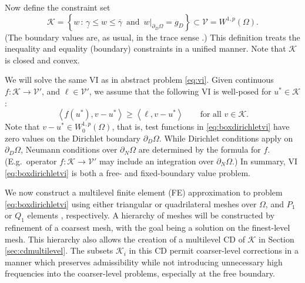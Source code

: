\documentclass[letterpaper,final,12pt,reqno]{amsart}
\theoremstyle{cstyle}
\theoremstyle{cstyle*}
\theoremstyle{dstyle}
\numberwithin{equation}{section}
\numberwithin{figure}{section}
\numberwithin{table}{section}
\numberwithin{theorem}{section}
\newcommand{\cK}{\mathcal{K}}
\newcommand{\cV}{\mathcal{V}}
\newcommand{\ip}[2]{\left<#1,#2\right>}
\begin{document}
Now define the constraint set
\begin{equation}
\cK = \left\{w\,:\,\underline{\gamma} \le w \le \overline{\gamma} \, \text{ and }\, w\big|_{\partial_D \Omega} = g_D\right\} \subset \cV =W^{1,p}(\Omega).
\end{equation}
(The boundary values are, as usual, in the trace sense \cite{Evans2010}.)  This definition treats the inequality and equality (boundary) constraints in a unified manner.  Note that $\cK$ is closed and convex.

We will solve the same VI as in abstract problem \eqref{eq:vi}.  Given continuous $f:\cK \to \cV'$, and $\ell \in \cV'$, we assume that the following VI is well-posed for $u^*\in \cK$:
\begin{equation}
\ip{f(u^*)}{v-u^*} \ge \ip{\ell}{v-u^*} \qquad \text{for all } v\in \cK. \label{eq:boxdirichletvi}
\end{equation}
Note that $v-u^* \in W_0^{1,p}(\Omega)$, that is, test functions in \eqref{eq:boxdirichletvi} have zero values on the Dirichlet boundary $\partial_D\Omega$.  While Dirichlet conditions apply on $\partial_D\Omega$, Neumann conditions over $\partial_N \Omega$ are determined by the formula for $f$.  (E.g.~operator $f:\cK\to\cV'$ may include an integration over $\partial_N\Omega$.)  In summary, VI \eqref{eq:boxdirichletvi} is both a free- and fixed-boundary value problem.

We now construct a multilevel finite element (FE) approximation to problem \eqref{eq:boxdirichletvi} using either triangular or quadrilateral meshes over $\Omega$, and $P_1$ or $Q_1$ elements \cite{Elmanetal2014}, respectively.  A hierarchy of meshes will be constructed by refinement of a coarsest mesh, with the goal being a solution on the finest-level mesh.  This hierarchy also allows the creation of a multilevel CD of $\cK$ in Section \ref{sec:cdmultilevel}.  The subsets $\cK_i$ in this CD permit coarser-level corrections in a manner which preserves admissibility while not introducing unnecessary high frequencies into the coarser-level problems, especially at the free boundary.
\end{document}
